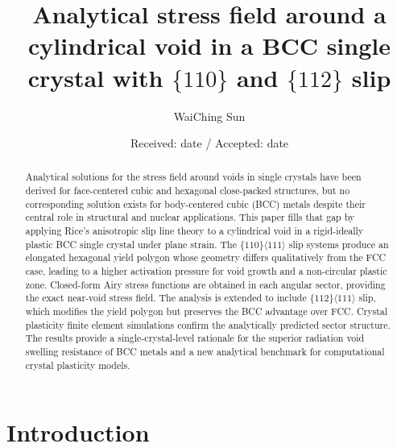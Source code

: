 \documentclass{svjour3} %
\begin{document}
\title{Analytical stress field around a cylindrical void in a
BCC single crystal with $\{110\}$ and $\{112\}$ slip}

\author{WaiChing Sun}


\date{Received: date / Accepted: date}

\maketitle

\begin{abstract}
Analytical solutions for the stress field around voids in single crystals
have been derived for face-centered cubic and hexagonal close-packed
structures, but no corresponding solution exists for body-centered cubic
(BCC) metals despite their central role in structural and nuclear
applications. This paper fills that gap by applying Rice's anisotropic
slip line theory to a cylindrical void in a rigid-ideally plastic BCC
single crystal under plane strain. The $\{110\}\langle 111\rangle$ slip
systems produce an elongated hexagonal yield polygon whose geometry
differs qualitatively from the FCC case, leading to a higher activation
pressure for void growth and a non-circular plastic zone. Closed-form
Airy stress functions are obtained in each angular sector, providing
the exact near-void stress field. The analysis is extended to
include $\{112\}\langle 111\rangle$ slip, which modifies the yield
polygon but preserves the BCC advantage over FCC. Crystal plasticity
finite element simulations confirm the analytically predicted sector
structure. The results provide a single-crystal-level rationale for the
superior radiation void swelling resistance of BCC metals and a new
analytical benchmark for computational crystal plasticity models.

\end{abstract}

\section{Introduction}
\label{sec:intro}
\end{document}
